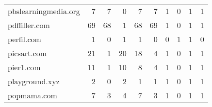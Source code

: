 \begin{tabular}{lrrrrrrrrr}
       pbslearningmedia.org &                                7 &                                  7 &                                      0 &                            7 &                           7 &                                   1 &                                      0 &                             1 &                            1 \\
              pdffiller.com &                               69 &                                 68 &                                      1 &                           68 &                          69 &                                   1 &                                      0 &                             1 &                            1 \\
                 perfil.com &                                1 &                                  0 &                                      1 &                            1 &                           0 &                                   0 &                                      1 &                             1 &                            0 \\
                picsart.com &                               21 &                                  1 &                                     20 &                           18 &                           4 &                                   1 &                                      0 &                             1 &                            1 \\
                  pier1.com &                               11 &                                  1 &                                     10 &                            8 &                           4 &                                   1 &                                      0 &                             1 &                            1 \\
             playground.xyz &                                2 &                                  0 &                                      2 &                            1 &                           1 &                                   1 &                                      0 &                             1 &                            1 \\
                popmama.com &                                7 &                                  3 &                                      4 &                            7 &                           3 &                                   1 &                                      0 &                             1 &                            1 \\

\end{tabular}
